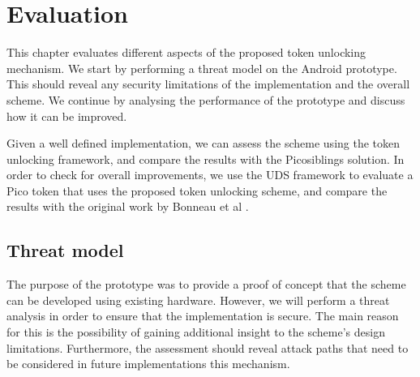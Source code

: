 
\chapter{Evaluation} %

\label{Chapter6} %


This chapter evaluates different aspects of the proposed token unlocking mechanism. We start by performing a threat model on the Android prototype. This should reveal any security limitations of the implementation and the overall scheme. We continue by analysing the performance of the prototype and discuss how it can be improved.

Given a well defined implementation, we can assess the scheme using the token unlocking framework, and compare the results with the Picosiblings solution. In order to check for overall improvements, we use the UDS framework to evaluate a Pico token that uses the proposed token unlocking scheme, and compare the results with the original work by Bonneau et al \cite{bonneau2012quest}.

\section{Threat model}

The purpose of the prototype was to provide a proof of concept that the scheme can be developed using existing hardware. However, we will perform a threat analysis in order to ensure that the implementation is secure. The main reason for this is the possibility of gaining additional insight to the scheme's design limitations. Furthermore, the assessment should reveal attack paths that need to be considered in future implementations this mechanism.

